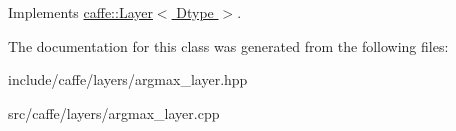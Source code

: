 Implements \hyperlink{classcaffe_1_1Layer_ad9d391b972c769c0ebee34ca6d1c973e}{caffe\+::\+Layer$<$ Dtype $>$}.



The documentation for this class was generated from the following files\+:\begin{DoxyCompactItemize}
\item 
include/caffe/layers/argmax\+\_\+layer.\+hpp\item 
src/caffe/layers/argmax\+\_\+layer.\+cpp\end{DoxyCompactItemize}
